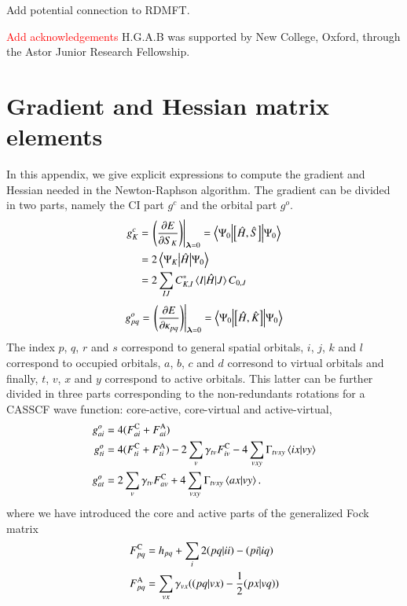 \documentclass[aip,jcp,reprint,noshowkeys,superscriptaddress]{revtex4-1}
\newcommand{\hugh}[1]{\textcolor{hughgreen}{#1}}
\newcommand{\todo}[1]{\textcolor{red}{#1}}
\begin{document}
\hugh{Add potential connection to RDMFT.}


\begin{acknowledgements}
\todo{Add acknowledgements}
H.G.A.B was supported by New College, Oxford, through the Astor Junior Research Fellowship.

\end{acknowledgements}

\appendix

\section{Gradient and Hessian matrix elements}
\label{app:appendixA}

In this appendix, we give explicit expressions to compute the gradient and Hessian needed in the Newton-Raphson algorithm.
The gradient can be divided in two parts, namely the CI part $g^c$ and the orbital part $g^o$.
\begin{align}
  \label{eq:CASSCF_CI_Gradient}
  g^c_{K} &= \eval{\mleft(\pdv{E}{S_{K}}\mright)}_{\bm{\lambda}=0} = \mel**{\Psi_0}{\com{\hH}{\hS}}{\Psi_0} \\
          &= 2\mel**{\Psi_K}{\hH}{\Psi_0} \notag \\
          &= 2\sum_{IJ}C_{K,I}^*\mel{I}{\hH}{J}C_{0,J} \notag
\end{align}
\begin{equation}
  \label{eq:CASSCF_Orb_Gradient_general}
  g^o_{pq} = \eval{\mleft(\pdv{E}{\kappa_{pq}}\mright)}_{\bm{\lambda}=0} = \mel**{\Psi_0}{\com{\hH}{\hK}}{\Psi_0}
\end{equation}
The index $p$, $q$, $r$ and $s$ correspond to general spatial orbitals, $i$, $j$, $k$ and $l$ correspond to occupied orbitals, $a$, $b$, $c$ and $d$ corresond to virtual orbitals and finally, $t$, $v$, $x$ and $y$ correspond to active orbitals.
This latter can be further divided in three parts corresponding to the non-redundants rotations for a CASSCF wave function: core-active, core-virtual and active-virtual,
\begin{subequations}
  \label{eq:CASSCF_Orb_Gradient}
  \begin{align}
    g^o_{ai} &= 4(F_{ai}^{\text{C}} + F_{ai}^{\text{A}}) \\
    g^o_{ti} &= 4(F_{ti}^{\text{C}} + F_{ti}^{\text{A}}) - 2\sum_v \gamma_{tv}F_{iv}^{\text{C}} -4\sum_{vxy}\Gamma_{tvxy}\braket{ix}{vy} \\
    g^o_{at} &= 2\sum_v \gamma_{tv}F_{av}^{\text{C}} + 4\sum_{vxy}\Gamma_{tvxy}\braket{ax}{vy}.
  \end{align}
\end{subequations}
where we have introduced the core and active parts of the generalized Fock matrix
\begin{align}
  \label{eq:CoreActGeneralizedFock}
  \FC{pq} &= h_{pq} + \sum_{i} 2\ceri{pq}{ii} - \ceri{pi}{iq} \\
  \FA{pq} &= \sum_{vx}\gamma_{vx}(\ceri{pq}{vx} - \frac{1}{2}\ceri{px}{vq})
\end{align}
\end{document}
